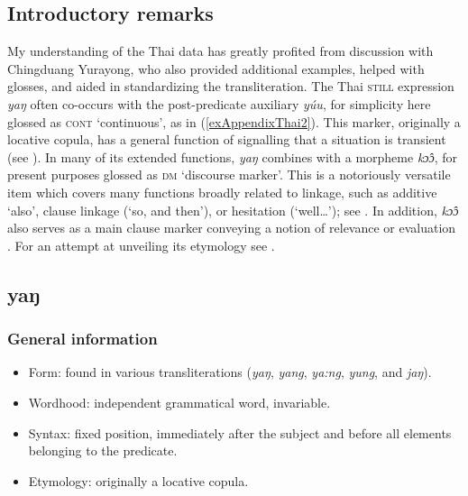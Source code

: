 \subsection{Introductory remarks}
\begin{sloppypar}
My understanding of the Thai data has greatly profited from discussion with Chingduang Yurayong, who also provided additional examples, helped with glosses, and aided in standardizing the transliteration. The Thai \textsc{still} expression \textit{yaŋ} often co-occurs with the post-predicate auxiliary \textit{yúu}, for simplicity here glossed as \textsc{cont} \lq continuous', as in (\ref{exAppendixThai2}). This marker, originally a locative copula, has a general function of signalling that a situation is transient (see \cite{Jenny2001}). In many of its extended functions, \textit{yaŋ} combines with a morpheme \textit{kɔ̂ɔ}, for present purposes glossed as \textsc{dm} \lq discourse marker'. This is a notoriously versatile item which covers many functions broadly related to linkage, such as additive \lq also', clause linkage (\lq so, and then'), or hesitation (\lq well…'); see  \textcite[170–177]{IwasakiIngkaphirom2005} . In addition, \textit{kɔ̂ɔ} also serves as a main clause marker conveying a notion of relevance or evaluation \parencite[253–254]{IwasakiIngkaphirom2005}. For an attempt at unveiling its etymology see \textcite{Burusphat2004}.
\end{sloppypar}

\subsection{yaŋ}

\subsubsection{General information}

\begin{itemize}
	\item Form: found in various transliterations (\textit{yaŋ}, \textit{yang}, \textit{ya:ng},  \textit{yung}, and \textit{jaŋ}).
	\item Wordhood: independent grammatical word, invariable.
	\item Syntax: fixed position, immediately after the subject and before all elements belonging to the predicate.
	\item Etymology: originally a locative copula.
\end{itemize}	

